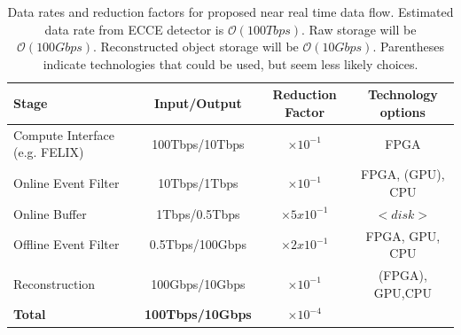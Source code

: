 \begin{table}[ht]
    \centering
    \begin{tabular}{p{4cm}|c|c|c}
        \hline
        Stage                        & Input/Output    & Reduction Factor & Technology options \\
        \hline
        \hline
        Compute Interface (e.g. FELIX) & 100Tbps/10Tbps  & $\times 10^{-1}$ & FPGA \\
        \hline
        Online Event Filter          & 10Tbps/1Tbps    & $\times 10^{-1}$ & FPGA, (GPU), CPU\\
        \hline
        Online Buffer                & 1Tbps/0.5Tbps   & $\times 5x10^{-1}$  & $<disk>$ \\
        \hline
        Offline Event Filter         & 0.5Tbps/100Gbps & $\times 2x10^{-1}$  & FPGA, GPU, CPU \\
        \hline
        Reconstruction               & 100Gbps/10Gbps  & $\times 10^{-1}$ & (FPGA), GPU,CPU\\
        \hline
        \hline
        \textbf{Total}               & \textbf{100Tbps/10Gbps} & \textbf{$\times 10^{-4}$} & \\
        \hline
    \end{tabular}
    \caption{Data rates and reduction factors for proposed near real time data flow. Estimated data rate from ECCE detector is $\mathcal{O}(100Tbps)$. Raw storage will be $\mathcal{O}(100Gbps)$. Reconstructed object storage will be $\mathcal{O}(10Gbps)$. Parentheses indicate technologies that could be used, but seem less likely choices.}
    \label{tab:reduction_factors}
\end{table}


